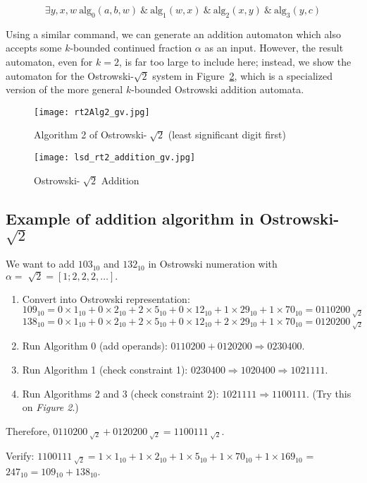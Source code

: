 \documentclass[a4paper]{article}
\theoremstyle{definition}
\theoremstyle{remark}
\theoremstyle{remark}
\theoremstyle{plain}
\begin{document}
{
$$\exists y,x,w ~\text{alg}_0(a,b,w) ~\& ~\text{alg}_1(w,x) ~\& ~\text{alg}_2(x,y) ~\& ~\text{alg}_3(y,c)$$}

Using a similar command, we can generate an addition automaton which also accepts some $k$-bounded continued fraction $\alpha$ as an input.
However, the result automaton, even for $k=2$, is far too large to include here; instead, we show the automaton for the Ostrowski-$\sqrt{2}$ system in Figure~\ref{fig:rt2_addition}, which is a specialized version of the more general $k$-bounded Ostrowski addition automata.

\begin{figure}[h]
	\centering
    \texttt{[image: rt2Alg2\_gv.jpg]}
    \caption{Algorithm 2 of Ostrowski-$\sqrt[~]{2}$ (least significant digit first)}
    \label{fig:rt2_alg2}
\end{figure}
\begin{figure}[h]
	\centering
    \texttt{[image: lsd\_rt2\_addition\_gv.jpg]}
    \caption{Ostrowski-$\sqrt[~]{2}$ Addition}
    \label{fig:rt2_addition}
\end{figure}



\subsection{Example of addition algorithm in Ostrowski-$\sqrt{2}$}

\begin{minipage}{\columnwidth}

We want to add $103_{10}$ and $132_{10}$ in Ostrowski numeration with $\alpha = \sqrt[~]{2}= [1; 2,2,2,\dots].$

\begin{enumerate}
\item Convert into Ostrowski representation:\\
$109_{10} = 0\times1_{10}+0\times2_{10}+2\times5_{10}+0\times12_{10}+1\times29_{10}+1\times70_{10}= 0110200_{\sqrt[]{2}}$
\\
$138_{10} = 0\times1_{10}+0\times2_{10}+2\times5_{10}+0\times12_{10}+2\times29_{10}+1\times70_{10} = 0120200_{\sqrt[]{2}}$
\item Run Algorithm 0 (add operands): $0110200 + 0120200 \Rightarrow 0230400$.
\item Run Algorithm 1 (check constraint 1): $0230400 \Rightarrow 1020400 \Rightarrow 1021111$.
\item Run Algorithms 2 and 3 (check constraint 2): $1021111 \Rightarrow 1100111$. (Try this on \emph{Figure 2}.)
\end{enumerate}

Therefore, $0110200_{\sqrt[]{2}}+0120200_{\sqrt[]{2}}=1100111_{\sqrt[]{2}}$.

Verify:
$1100111_{\sqrt[]{2}}  = 1\times1_{10}+1\times2_{10}+1\times5_{10}+1\times70_{10}+1\times169_{10}$ = $247_{10} = 109_{10}+138_{10}$.\\

\end{minipage}
\end{document}
